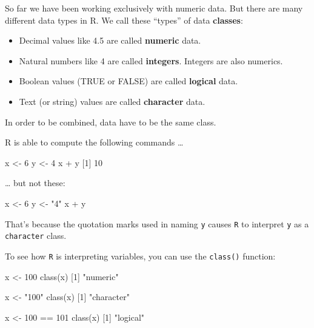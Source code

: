 \documentclass[
]{book}
\newenvironment{Shaded}{\begin{snugshade}}{\end{snugshade}}
\newcommand{\DecValTok}[1]{\textcolor[rgb]{0.00,0.00,0.81}{#1}}
\newcommand{\FunctionTok}[1]{\textcolor[rgb]{0.00,0.00,0.00}{#1}}
\newcommand{\NormalTok}[1]{#1}
\newcommand{\OtherTok}[1]{\textcolor[rgb]{0.56,0.35,0.01}{#1}}
\newcommand{\SpecialCharTok}[1]{\textcolor[rgb]{0.00,0.00,0.00}{#1}}
\newcommand{\StringTok}[1]{\textcolor[rgb]{0.31,0.60,0.02}{#1}}
\providecommand{\tightlist}{%
  \setlength{\itemsep}{0pt}\setlength{\parskip}{0pt}}
\begin{document}
So far we have been working exclusively with numeric data. But there are many different data types in R. We call these ``types'' of data \textbf{classes}:

\begin{itemize}
\tightlist
\item
  Decimal values like 4.5 are called \textbf{numeric} data.
\item
  Natural numbers like 4 are called \textbf{integers}. Integers are also numerics.
\item
  Boolean values (TRUE or FALSE) are called \textbf{logical} data.
\item
  Text (or string) values are called \textbf{character} data.
\end{itemize}

In order to be combined, data have to be the same class.

R is able to compute the following commands \ldots{}

\begin{Shaded}
\begin{Highlighting}[]
\NormalTok{x }\OtherTok{\textless{}{-}} \DecValTok{6}
\NormalTok{y }\OtherTok{\textless{}{-}} \DecValTok{4}
\NormalTok{x }\SpecialCharTok{+}\NormalTok{ y}
\NormalTok{[}\DecValTok{1}\NormalTok{] }\DecValTok{10}
\end{Highlighting}
\end{Shaded}

\ldots{} but not these:

\begin{Shaded}
\begin{Highlighting}[]
\NormalTok{x }\OtherTok{\textless{}{-}} \DecValTok{6}
\NormalTok{y }\OtherTok{\textless{}{-}} \StringTok{"4"}
\NormalTok{x }\SpecialCharTok{+}\NormalTok{ y}
\end{Highlighting}
\end{Shaded}

That's because the quotation marks used in naming \texttt{y} causes \texttt{R} to interpret \texttt{y} as a \texttt{character} class.

To see how \texttt{R} is interpreting variables, you can use the \texttt{class()} function:

\begin{Shaded}
\begin{Highlighting}[]
\NormalTok{x }\OtherTok{\textless{}{-}} \DecValTok{100}
\FunctionTok{class}\NormalTok{(x)}
\NormalTok{[}\DecValTok{1}\NormalTok{] }\StringTok{"numeric"}

\NormalTok{x }\OtherTok{\textless{}{-}} \StringTok{"100"}
\FunctionTok{class}\NormalTok{(x)}
\NormalTok{[}\DecValTok{1}\NormalTok{] }\StringTok{"character"}

\NormalTok{x }\OtherTok{\textless{}{-}} \DecValTok{100} \SpecialCharTok{==} \DecValTok{101}
\FunctionTok{class}\NormalTok{(x)}
\NormalTok{[}\DecValTok{1}\NormalTok{] }\StringTok{"logical"}
\end{Highlighting}
\end{Shaded}
\end{document}
